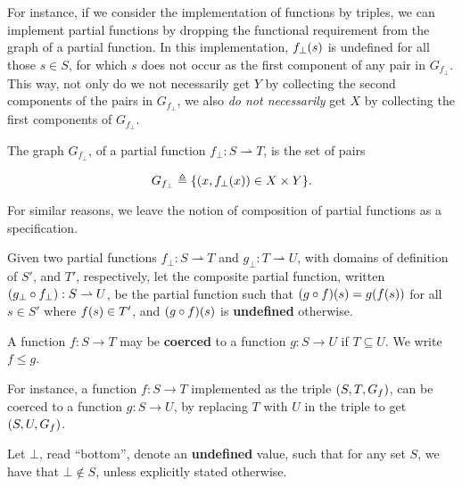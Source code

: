 For instance, if we consider the implementation of functions by triples, we can
implement partial functions by dropping the functional requirement from the
graph of a partial function. In this implementation, $f_\bot\mathopen{}\left({s}\right)\mathclose{}$ is undefined
for all those $s\in S$, for which $s$ does not occur as the first component of
any pair in $G_{f_\bot}$. This way, not only do we not necessarily get $Y$ by
collecting the second components of the pairs in $G_{f_\bot}$, we also \emph{do
not necessarily} get $X$ by collecting the first components of $G_{f_\bot}$.

\begin{definition} The graph $G_{f_\bot}$, of a partial function $f_\bot : S
\rightharpoonup T$, is the set of pairs

$$G_{f_\bot} \triangleq \mathopen{}\left\{{\mathopen{}\left({x,f_\bot\mathopen{}\left({x}\right)\mathclose{}}\right)\mathclose{}\in X \times Y}\right\}\mathclose{}.$$

\end{definition}

For similar reasons, we leave the notion of composition of partial functions as
a specification.

\begin{specification} \label{spec:partial-composition} Given two partial
functions $f_\bot : S \rightharpoonup T$ and $g_\bot : T \rightharpoonup U$,
with domains of definition of $S'$, and $T'$, respectively, let the composite
partial function, written $\mathopen{}\left({g_\bot \circ f_\bot}\right)\mathclose{} : S \rightharpoonup U$, be
the partial function such that $\mathopen{}\left({g \circ f}\right)\mathclose{}\mathopen{}\left({s}\right)\mathclose{} = g\mathopen{}\left({f\mathopen{}\left({s}\right)\mathclose{}}\right)\mathclose{}$ for all $s\in
S'$ where $f\mathopen{}\left({s}\right)\mathclose{} \in T'$, and $\mathopen{}\left({g \circ f}\right)\mathclose{}\mathopen{}\left({s}\right)\mathclose{}$ is \textbf{undefined}
otherwise.  \end{specification}

\begin{definition} \label{def:codomain-coersion} A function $f:S\rightarrow T$
may be \textbf{coerced} to a function $g:S\rightarrow U$ if $T\subseteq U$. We
write $f \leq g$.  \end{definition}

For instance, a function $f:S\rightarrow T$ implemented as the triple
$\mathopen{}\left({S,T,G_f}\right)\mathclose{}$, can be coerced to a function $g:S\rightarrow U$, by replacing
$T$ with $U$ in the triple to get $\mathopen{}\left({S,U,G_f}\right)\mathclose{}$. 


\begin{definition} Let $\bot$, read ``bottom'', denote an \textbf{undefined}
value, such that for any set $S$, we have that $\bot\notin S$, unless
explicitly stated otherwise. \end{definition}

